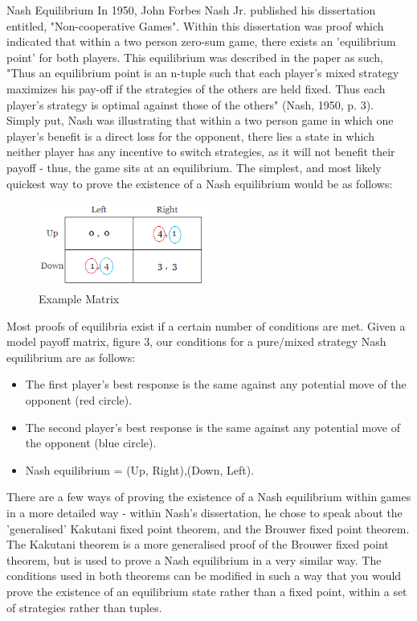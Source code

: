 \documentclass[12pt,a4paper]{article}
\makeatletter
\renewcommand\subsection{\@startsection {subsection}{1}{2mm}
                               {3pt plus 2pt minus 1pt}
                               {3pt plus 0pt}
                               {\normalfont\bfseries}}
\makeatother
\begin{document}
\subsection{Nash Equilibrium}
In 1950, John Forbes Nash Jr. published his dissertation entitled, "Non-cooperative Games". Within this dissertation was proof which indicated that within a two person zero-sum game, there exists an 'equilibrium point' for both players. This equilibrium was described in the paper as such, "Thus an equilibrium point is an n-tuple such that each player's mixed strategy maximizes his pay-off if the strategies of the others are held fixed. Thus each player's strategy is optimal against those of the others" (Nash, 1950, p. 3). Simply put, Nash was illustrating that within a two person game in which one player's benefit is a direct loss for the opponent, there lies a state in which neither player has any incentive to switch strategies, as it will not benefit their payoff - thus, the game sits at an equilibrium. The simplest, and most likely quickest way to prove the existence of a Nash equilibrium would be as follows:

\begin{figure}[H]
	\centering
		\includegraphics[width=0.5\textwidth]{ModelMatrix}
		\caption{Example Matrix}
\end{figure}

\noindent
Most proofs of equilibria exist if a certain number of conditions are met. Given a model payoff matrix, figure 3, our conditions for a pure/mixed strategy Nash equilibrium are as follows:

\begin{itemize}
  \item The first player's best response is the same against any potential move of the opponent (red circle).
  \item The second player's best response is the same against any potential move of the opponent (blue circle).
  \item Nash equilibrium = (Up, Right),(Down, Left).
\end{itemize}

\noindent
There are a few ways of proving the existence of a Nash equilibrium within games in a more detailed way - within Nash's dissertation, he chose to speak about the 'generalised' Kakutani fixed point theorem, and the Brouwer fixed point theorem. The Kakutani theorem is a more generalised proof of the Brouwer fixed point theorem, but is used to prove a Nash equilibrium in a very similar way. The conditions used in both theorems can be modified in such a way that you would prove the existence of an equilibrium state rather than a fixed point, within a set of strategies rather than tuples.
\end{document}
